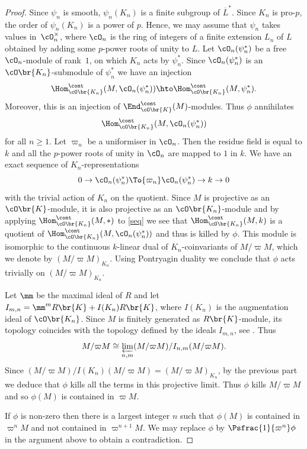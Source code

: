 \begin{proof} Since $\psi_n$ is smooth, $\psi_n(K_n)$ is a finite subgroup of $\overline{L}^*$. Since $K_n$ is pro-$p$, the order of $\psi_n(K_n)$ is a power of $p$. Hence, we may assume that $\psi_n$ takes values in~$\cO_n^{\times}$, where $\cO_n$ is
the ring of integers of a finite extension $L_n$ of $L$ obtained by adding some $p$-power roots of unity to $L$. Let $\cO_n(\psi_n^*)$ be a free $\cO_n$-module of rank~$1$, on which $K_n$ acts by $\psi_n^*$. Since $\cO_n(\psi_n^*)$ is an $\cO\br{K_n}$-submodule of $\psi_n^*$ we have an injection
\[
\Hom_{\cO\br{K_n}}^{\cont}(M, \cO_n(\psi_n^*))\hto
\Hom_{\cO\br{K_n}}^{\cont}(M, \psi_n^*).
\]
Moreover, this is an injection of $\End_{\cO\br{K}}^{\cont}(M)$-modules. Thus $\phi$ annihilates
\[
\Hom_{\cO\br{K_n}}^{\cont}(M, \cO_n(\psi_n^*))
\]
for all $n\ge 1$. Let $\varpi_n$ be a uniformiser in $\cO_n$. Then the residue field is equal to $k$ and all the $p$-power roots of unity in $\cO_n$ are mapped to $1$ in $k$. We have an exact sequence of $K_n$-representations
\begin{equation}\label{seq}
0\to \cO_n(\psi_n^*)\To{\varpi_n}\cO_n(\psi_n^*)\to k\to 0
\end{equation}
with the trivial action of $K_n$ on the quotient. Since $M$ is projective as an $\cO\br{K}$-module,
it is also projective as an $\cO\br{K_n}$-module and
by applying $\Hom^{\cont}_{\cO\br{K_n}}(M, \ast)$ to \eqref{seq} we see that
$\Hom^{\cont}_{\cO\br{K_n}}(M, k)$ is a quotient of $\Hom_{\cO\br{K_n}}^{\cont}(M, \cO_n(\psi_n^*))$ and thus is killed by $\phi$. This module is isomorphic to the continuous $k$-linear dual of $K_n$-coinvariants
of $M/\varpi M$, which we denote by $(M/\varpi M)_{K_n}$. Using Pontryagin duality we conclude that $\phi$ acts trivially on $(M/\varpi M)_{K_n}$.

Let $\mm$ be the maximal ideal of $R$ and let $I_{m,n}= \mm^m R\br{K} + I(K_n)R\br{K}$, where $I(K_n)$ is
the augmentation ideal of $\cO\br{K_n}$. Since $M$ is finitely generated as $R\br{K}$\nobreakdash-mod\-ule, its topology coincides with the topology defined by the ideals $I_{m,n}$, see \cite[(5.2.17)]{nsw2}. Thus
\[
M/\varpi M \cong \varprojlim_{n, m} (M/\varpi M)/ I_{n,m} (M/\varpi M). 
\]
Since $(M/\varpi M)/ I(K_n) ( M/\varpi M)= (M/\varpi M)_{K_n}$, by the previous part we deduce that $\phi$ kills all the terms in this projective limit. Thus $\phi$ kills $M/\varpi M$ and so $\phi(M)$ is contained in $\varpi M$.

If $\phi$ is non-zero then there is a largest integer $n$ such that $\phi(M)$ is contained in $\varpi^n M$ and
not contained in
$\varpi^{n+1} M$. We may replace $\phi$ by $\Psfrac{1}{\varpi^n}\phi $ in the argument above to obtain a contradiction.
\end{proof}


